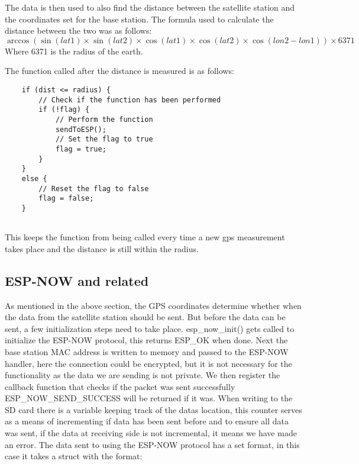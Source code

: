 \noindent
The data is then used to also find the distance between the satellite station and the coordinates set for the base station. The formula used to calculate the distance between the two was as follows:
\begin{equation}\label{eq:distance}
	\arccos(\sin(lat1)\times\sin(lat2)\times\cos(lat1)\times\cos(lat2)\times\cos(lon2-lon1)) \times 6371
\end{equation}
Where 6371 is the radius of the earth.

\noindent
The function called after the distance is measured is as follows:
	
\begin{lstlisting}
	if (dist <= radius) {
		// Check if the function has been performed
		if (!flag) {
			// Perform the function
			sendToESP();
			// Set the flag to true
			flag = true;
		}
	} 
	else {
		// Reset the flag to false
		flag = false;
	}   
	
\end{lstlisting}
This keeps the function from being called every time a new gps measurement takes place and the distance is still within the radius.
\subsection{ESP-NOW and related}
As mentioned in the above section, the GPS coordinates determine whether when the data from the satellite station should be sent. But before the data can be sent, a few initialization steps need to take place.
esp\_now\_init() gets called to initialize the ESP-NOW protocol, this returns ESP\_OK when done. Next the base station MAC address is written to memory and passed to the ESP-NOW handler, here the connection could be encrypted, but it is not necessary for the functionality as the data we are sending is not private. We then register the callback function that checks if the packet was sent successfully ESP\_NOW\_SEND\_SUCCESS will be returned if it was. When writing to the SD card there is a variable keeping track of the datas location, this counter serves as a means of incrementing if data has been sent before and to ensure all data was sent, if the data at receiving side is not incremental, it means we have made an error. The data sent to using the ESP-NOW protocol has a set format, in this case it takes a struct with the format:


